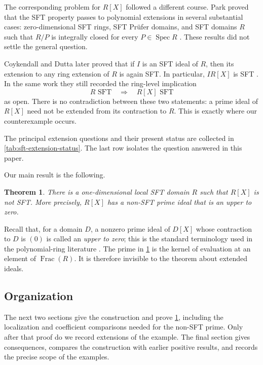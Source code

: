 \documentclass[11pt,reqno]{amsart}
\numberwithin{equation}{section}
\theoremstyle{plain}
\newtheorem{theorem}{Theorem}[section]
\theoremstyle{definition}
\theoremstyle{remark}
\newcommand{\Spec}{\operatorname{Spec}}
\newcommand{\Frac}{\operatorname{Frac}}
\begin{document}
The corresponding problem for $R[X]$ followed a different course.  Park
proved that the SFT property passes to polynomial extensions in several
substantial cases: zero-dimensional SFT rings, SFT Pr\"ufer domains, and SFT
domains $R$ such that $R/P$ is integrally closed for every
$P\in\Spec R$ \cite{Park2019}.  These results did not settle the general
question.

Coykendall and Dutta later proved that if $I$ is an SFT ideal of $R$, then
its extension to any ring extension of $R$ is again SFT.  In particular,
$IR[X]$ is SFT \cite[Theorem~4.13]{CoykendallDutta2024}.  In the same work
they still recorded the ring-level implication
\[
  R\text{ SFT}\quad\Longrightarrow\quad R[X]\text{ SFT}
\]
as open.  There is no contradiction between these two statements: a prime
ideal of $R[X]$ need not be extended from its contraction to $R$.  This is
exactly where our counterexample occurs.

The principal extension questions and their present status are collected in
\cref{tab:sft-extension-status}.  The last row isolates the question answered
in this paper.

Our main result is the following.

\begin{theorem}\label{thm:main}
There is a one-dimensional local SFT domain $R$ such that $R[X]$ is not
SFT.  More precisely, $R[X]$ has a non-SFT prime ideal that is an upper to
zero.
\end{theorem}

Recall that, for a domain $D$, a nonzero prime ideal of $D[X]$ whose
contraction to $D$ is $(0)$ is called an \emph{upper to zero}; this is the
standard terminology used in the polynomial-ring literature
\cite[p.~168]{ChangFontana2009}.  The prime in
\cref{thm:main} is the kernel of evaluation at an element of
$\Frac(R)$.  It is therefore invisible to the theorem about extended
ideals.

\subsection{Organization}

The next two sections give the construction and prove \cref{thm:main},
including the localization and coefficient comparisons needed for the
non-SFT prime.  Only after that proof do we record extensions of the example.
The final section gives consequences, compares the construction with earlier
positive results, and records the precise scope of the examples.
\end{document}
